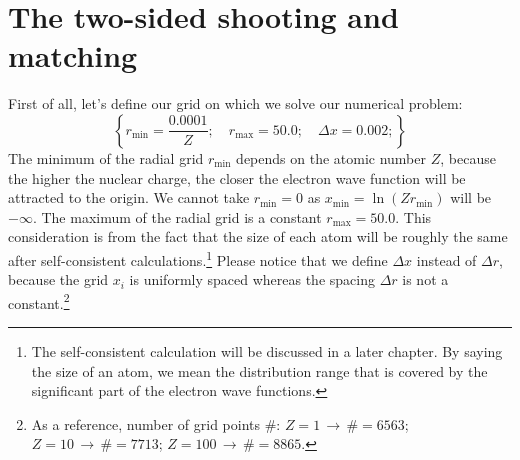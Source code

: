 \section{The two-sided shooting and matching}
First of all, let's define our grid on which we solve our numerical problem:
\begin{equation} \label{eq:grid}
\left\{ r_{\text{min}} = \frac{0.0001}{Z};\quad r_{\text{max}} = 50.0;\quad \Delta x = 0.002; \right\}
\end{equation}
The minimum of the radial grid $r_{\text{min}}$ depends on the atomic number $Z$,
because the higher the nuclear charge, the closer the electron wave function
will be attracted to the origin. We cannot take $r_{\text{min}}=0$
as $x_{\text{min}} = \ln{(Zr_{\text{min}})}$ will be $-\infty$. The maximum of the radial
grid is a constant $r_{\text{max}} = 50.0$. This consideration is from the fact that the size of
each atom will be roughly the same after self-consistent calculations.\footnote{The
self-consistent calculation will be discussed in a later chapter.
By saying the size of an atom, we mean the distribution range that is covered
by the significant part of the electron wave functions.} Please notice that
we define $\Delta x$ instead of $\Delta r$, because the grid $x_i$ is uniformly
spaced whereas the spacing $\Delta r$ is not a constant.\footnote{As a reference,
number of grid points $\#$: $Z=1\,\rightarrow\,\#=6563$; $Z=10\,\rightarrow\,\#=7713$;
$Z=100\,\rightarrow\,\#=8865$.}

